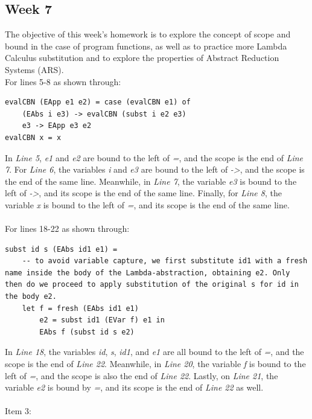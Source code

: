 \documentclass{article}
\theoremstyle{theorem}
\theoremstyle{definition}
\theoremstyle{remark}
\begin{document}
\subsection{Week 7}
The objective of this week's homework is to explore the concept of scope and bound in the case of program functions, as well as to practice more Lambda Calculus substitution and to explore the properties of Abstract Reduction Systems (ARS).
\\
For lines 5-8 as shown through:
\begin{lstlisting}
evalCBN (EApp e1 e2) = case (evalCBN e1) of
    (EAbs i e3) -> evalCBN (subst i e2 e3)
    e3 -> EApp e3 e2
evalCBN x = x
\end{lstlisting}
In \textit{Line 5}, \textit{e1} and \textit{e2} are bound to the left of \textit{=}, and the scope is the end of \textit{Line 7}. For \textit{Line 6}, the variables \textit{i} and \textit{e3} are bound to the left of \textit{->}, and the scope is the end of the same line. Meanwhile, in \textit{Line 7}, the variable \textit{e3} is bound to the left of \textit{->}, and its scope is the end of the same line. Finally, for \textit{Line 8}, the variable \textit{x} is bound to the left of \textit{=}, and its scope is the end of the same line.
\\
\\
For lines 18-22 as shown through:
\begin{lstlisting}
subst id s (EAbs id1 e1) =
    -- to avoid variable capture, we first substitute id1 with a fresh name inside the body of the Lambda-abstraction, obtaining e2. Only then do we proceed to apply substitution of the original s for id in the body e2.
    let f = fresh (EAbs id1 e1)
        e2 = subst id1 (EVar f) e1 in
        EAbs f (subst id s e2)
\end{lstlisting}
In \textit{Line 18}, the variables \textit{id}, \textit{s}, \textit{id1}, and \textit{e1} are all bound to the left of \textit{=}, and the scope is the end of \textit{Line 22}. Meanwhile, in \textit{Line 20}, the variable \textit{f} is bound to the left of \textit{=}, and the scope is also the end of \textit{Line 22}. Lastly, on \textit{Line 21}, the variable \textit{e2} is bound by \textit{=}, and its scope is the end of \textit{Line 22} as well.
\\
\\
Item 3:
\end{document}
